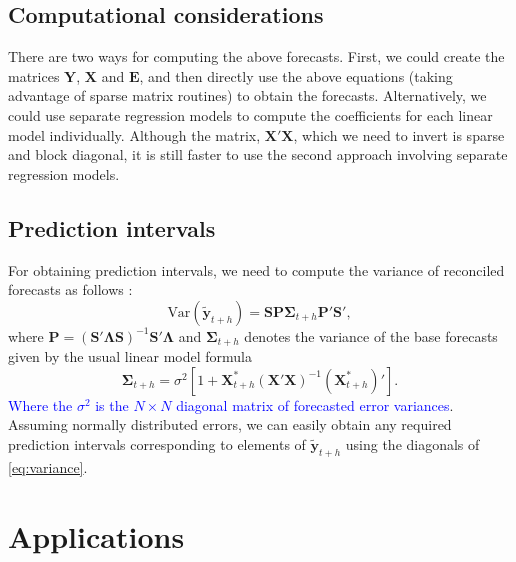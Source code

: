 \documentclass[11pt,a4paper,]{article}
\begin{document}
\hypertarget{computational-considerations}{%
\subsection{\texorpdfstring{Computational considerations \label{sec:computationalconsiderations}}{Computational considerations }}\label{computational-considerations}}

There are two ways for computing the above forecasts. First, we could create the matrices \(\bm{Y}\), \(\bm{X}\) and \(\bm{E}\), and then directly use the above equations (taking advantage of sparse matrix routines) to obtain the forecasts. Alternatively, we could use separate regression models to compute the coefficients for each linear model individually. Although the matrix, \(\bm{X}'\bm{X}\), which we need to invert is sparse and block diagonal, it is still faster to use the second approach involving separate regression models.

\hypertarget{prediction-intervals}{%
\subsection{Prediction intervals}\label{prediction-intervals}}

For obtaining prediction intervals, we need to compute the variance of reconciled forecasts as follows \autocite{mint2018}:
\begin{equation}\label{eq:variance}
    \text{Var}(\tilde{\bm{y}}_{t+h})
        = \bm{S}\bm{P}{\bm{\Sigma}_{t+h}} \bm{P}'\bm{S}',
\end{equation}
where \(\bm{P} = (\bm{S}'\bm{\Lambda}\bm{S})^{-1}\bm{S}'\bm{\Lambda}\) and \({\bm{\Sigma}_{t+h}}\) denotes the variance of the base forecasts given by the usual linear model formula \autocite{fpp2}
\[
  \bm{\Sigma}_{t+h} = \sigma^2\left[1 + \bm{X}_{t+h}^*(\bm{X}'\bm{X})^{-1}(\bm{X}_{t+h}^*)'\right].
\]
\textcolor{blue}{Where the  $\sigma^2$ is the $N\times N$ diagonal matrix of forecasted error variances}. Assuming normally distributed errors, we can easily obtain any required prediction intervals corresponding to elements of \(\tilde{\bm{y}}_{t+h}\) using the diagonals of \eqref{eq:variance}.

\hypertarget{applications}{%
\section{Applications}\label{applications}}
\end{document}
